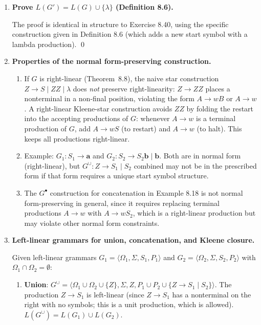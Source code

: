 \begin{enumerate}[{8.}1. ]
\item \textbf{Prove $L(G') = L(G) \cup \{\lambda\}$ (Definition 8.6).}

The proof is identical in structure to Exercise 8.40, using the specific construction given in Definition 8.6 (which adds a new start symbol with a lambda production). \qed

\item \textbf{Properties of the normal form-preserving construction.}

\begin{enumerate}
\item If $G$ is right-linear (Theorem~8.8), the naive star construction $Z \to S \mid ZZ \mid \lambda$ does \emph{not} preserve right-linearity: $Z \to ZZ$ places a nonterminal in a non-final position, violating the form $A \to wB$ or $A \to w$.
A right-linear Kleene-star construction avoids $ZZ$ by folding the restart into the accepting productions of $G$: whenever $A \to w$ is a terminal production of $G$, add $A \to wS$ (to restart) and $A \to w$ (to halt). This keeps all productions right-linear.

\item Example: $G_1: S_1 \to \pmb{a}$ and $G_2: S_2 \to S_2\pmb{b} \mid \pmb{b}$. Both are in normal form (right-linear), but $G^\cup: Z \to S_1 \mid S_2$ combined may not be in the prescribed form if that form requires a unique start symbol structure.

\item The $G^\bullet$ construction for concatenation in Example 8.18 is not normal form-preserving in general, since it requires replacing terminal productions $A \to w$ with $A \to wS_2$, which is a right-linear production but may violate other normal form constraints.
\end{enumerate}

\item \textbf{Left-linear grammars for union, concatenation, and Kleene closure.}

Given left-linear grammars $G_1 = \langle\Omega_1,\Sigma,S_1,P_1\rangle$ and $G_2 = \langle\Omega_2,\Sigma,S_2,P_2\rangle$ with $\Omega_1 \cap \Omega_2 = \emptyset$:

\begin{enumerate}
\item \textbf{Union}: $G^\cup = \langle\Omega_1\cup\Omega_2\cup\{Z\},\Sigma,Z,P_1\cup P_2\cup\{Z\to S_1\mid S_2\}\rangle$. The production $Z \to S_1$ is left-linear (since $Z \to S_1$ has a nonterminal on the right with no symbols; this is a unit production, which is allowed). $L(G^\cup) = L(G_1) \cup L(G_2)$.


\end{enumerate}
\end{enumerate}
